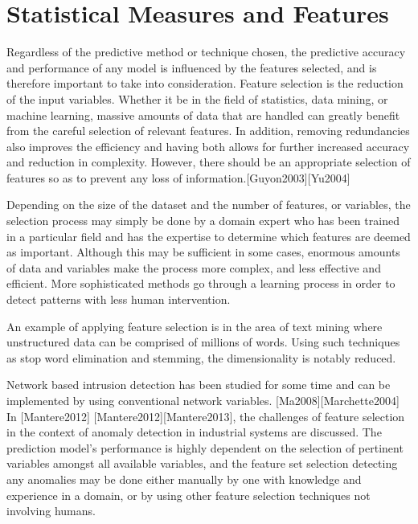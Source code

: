 \documentclass[12pt,]{article}
\begin{document}
\pagebreak

\section{Statistical Measures and
Features}\label{statistical-measures-and-features}

Regardless of the predictive method or technique chosen, the predictive
accuracy and performance of any model is influenced by the features
selected, and is therefore important to take into consideration. Feature
selection is the reduction of the input variables. Whether it be in the
field of statistics, data mining, or machine learning, massive amounts
of data that are handled can greatly benefit from the careful selection
of relevant features. In addition, removing redundancies also improves
the efficiency and having both allows for further increased accuracy and
reduction in complexity. However, there should be an appropriate
selection of features so as to prevent any loss of
information.{[}Guyon2003{]}{[}Yu2004{]}

Depending on the size of the dataset and the number of features, or
variables, the selection process may simply be done by a domain expert
who has been trained in a particular field and has the expertise to
determine which features are deemed as important. Although this may be
sufficient in some cases, enormous amounts of data and variables make
the process more complex, and less effective and efficient. More
sophisticated methods go through a learning process in order to detect
patterns with less human intervention.

An example of applying feature selection is in the area of text mining
where unstructured data can be comprised of millions of words. Using
such techniques as stop word elimination and stemming, the
dimensionality is notably reduced.

Network based intrusion detection has been studied for some time and can
be implemented by using conventional network variables.
{[}Ma2008{]}{[}Marchette2004{]} In {[}Mantere2012{]}
{[}Mantere2012{]}{[}Mantere2013{]}, the challenges of feature selection
in the context of anomaly detection in industrial systems are discussed.
The prediction model's performance is highly dependent on the selection
of pertinent variables amongst all available variables, and the feature
set selection detecting any anomalies may be done either manually by one
with knowledge and experience in a domain, or by using other feature
selection techniques not involving humans.
\end{document}
